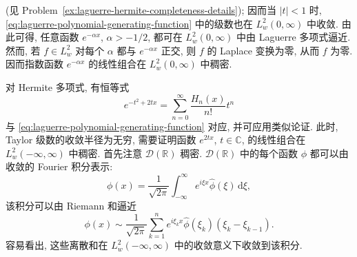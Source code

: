 (见 Problem~\ref{ex:laguerre-hermite-completeness-details}); 因而当 $|t|<1$ 时, \eqref{eq:laguerre-polynomial-generating-function} 中的级数也在 $L_w^2(0,\infty)$ 中收敛. 由此可得, 任意函数 $e^{-\alpha x}$, $\alpha>-1/2$, 都可在 $L_w^2(0,\infty)$ 中由 Laguerre 多项式逼近. 然而, 若 $f\in L_w^2$ 对每个 $\alpha$ 都与 $e^{-\alpha x}$ 正交, 则 $f$ 的 Laplace 变换为零, 从而 $f$ 为零. 因而指数函数 $e^{-\alpha x}$ 的线性组合在 $L_w^2(0,\infty)$ 中稠密.

对 Hermite 多项式, 有恒等式
\begin{equation}\label{eq:hermite-polynomial-generating-function}
e^{-t^2+2tx}=\sum_{n=0}^\infty\dfrac{H_n(x)}{n!}t^n
\end{equation}
与 \eqref{eq:laguerre-polynomial-generating-function} 对应, 并可应用类似论证. 此时, Taylor 级数的收敛半径为无穷, 需要证明函数 $e^{2tx}$, $t\in\mathbb{C}$, 的线性组合在 $L_w^2(-\infty,\infty)$ 中稠密. 首先注意 $\mathcal{D}(\mathbb{R})$ 稠密. $\mathcal{D}(\mathbb{R})$ 中的每个函数 $\phi$ 都可以由收敛的 Fourier 积分表示:
\begin{equation}\label{eq:hermite-completeness-fourier-inversion}
\phi(x)=\dfrac1{\sqrt{2\pi}}\int_{-\infty}^\infty e^{i\xi x}\widehat\phi(\xi)\,\mathrm{d}\xi,
\end{equation}
该积分可以由 Riemann 和逼近
\begin{equation}\label{eq:hermite-completeness-fourier-riemann-sums}
\phi(x)\sim\dfrac1{\sqrt{2\pi}}\sum_{k=1}^n e^{i\xi_kx}\widehat\phi(\xi_k)(\xi_k-\xi_{k-1}).
\end{equation}
容易看出, 这些离散和在 $L_w^2(-\infty,\infty)$ 中的收敛意义下收敛到该积分.

